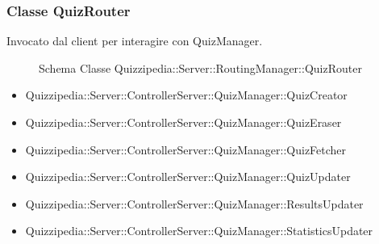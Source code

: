 \subsubsection{Classe QuizRouter}
Invocato dal client per interagire con QuizManager.
\begin{figure}[H]
\centering
\noindent{}
\caption{Schema Classe Quizzipedia::Server::RoutingManager::QuizRouter}
\end{figure}
\begin{itemize}
\item Quizzipedia::Server::ControllerServer::QuizManager::QuizCreator
\item Quizzipedia::Server::ControllerServer::QuizManager::QuizEraser
\item Quizzipedia::Server::ControllerServer::QuizManager::QuizFetcher
\item Quizzipedia::Server::ControllerServer::QuizManager::QuizUpdater
\item Quizzipedia::Server::ControllerServer::QuizManager::ResultsUpdater
\item Quizzipedia::Server::ControllerServer::QuizManager::StatisticsUpdater
\end{itemize}
